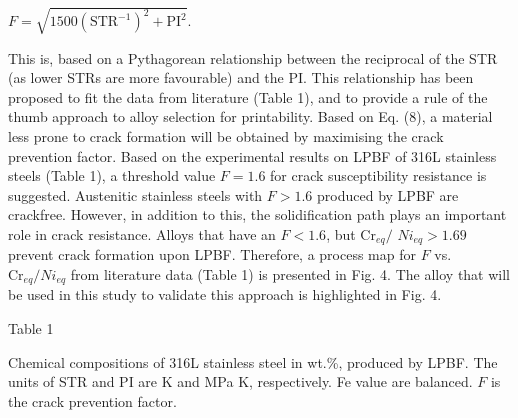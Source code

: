 \documentclass[10pt]{article}
\begin{document}
$F=\sqrt{1500\left(\mathrm{STR}^{-1}\right)^{2}+\mathrm{PI}^{2}}$.

This is, based on a Pythagorean relationship between the reciprocal of the STR (as lower STRs are more favourable) and the PI. This relationship has been proposed to fit the data from literature (Table 1), and to provide a rule of the thumb approach to alloy selection for printability. Based on Eq. (8), a material less prone to crack formation will be obtained by maximising the crack prevention factor. Based on the experimental results on LPBF of 316L stainless steels (Table 1), a threshold value $F=1.6$ for crack susceptibility resistance is suggested. Austenitic stainless steels with $F>1.6$ produced by LPBF are crackfree. However, in addition to this, the solidification path plays an important role in crack resistance. Alloys that have an $F<1.6$, but $\mathrm{Cr}_{e q} /$ $N i_{e q}>1.69$ prevent crack formation upon LPBF. Therefore, a process map for $F$ vs. $\mathrm{Cr}_{e q} / N i_{e q}$ from literature data (Table 1) is presented in Fig. 4. The alloy that will be used in this study to validate this approach is highlighted in Fig. 4.

Table 1

Chemical compositions of 316L stainless steel in wt.\%, produced by LPBF. The units of STR and PI are K and MPa K, respectively. Fe value are balanced. $F$ is the crack prevention factor.
\end{document}
